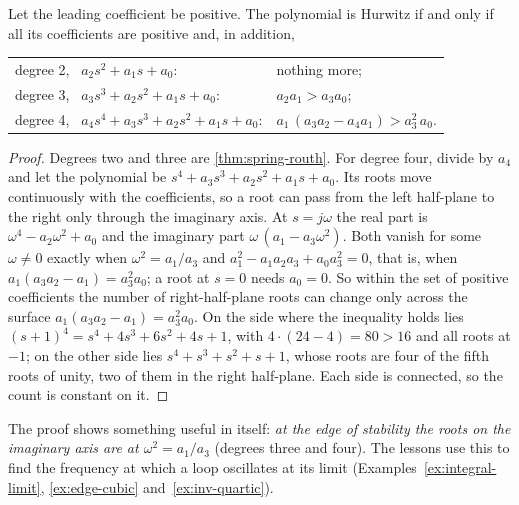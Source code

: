 \begin{theorem}
\label{thm:B-low}
Let the leading coefficient be positive. The polynomial is Hurwitz if and only if all its coefficients are positive and, in addition,
\begin{center}
\renewcommand{\arraystretch}{1.35}
\begin{tabular}{@{}ll@{}}
degree 2, \ $a_2s^2 + a_1s + a_0$: & nothing more;\\
degree 3, \ $a_3s^3 + a_2s^2 + a_1s + a_0$: & $a_2a_1 > a_3a_0$;\\
degree 4, \ $a_4s^4 + a_3s^3 + a_2s^2 + a_1s + a_0$: & $a_1\,(a_3a_2 - a_4a_1) > a_3^2\,a_0$.
\end{tabular}
\end{center}
\end{theorem}
\begin{proof}
Degrees two and three are \cref{thm:spring-routh}. For degree four, divide by $a_4$ and let the polynomial be $s^4 + a_3s^3 + a_2s^2 + a_1s + a_0$. Its roots move continuously with the coefficients, so a root can pass from the left half-plane to the right only through the imaginary axis. At $s = j\omega$ the real part is $\omega^4 - a_2\omega^2 + a_0$ and the imaginary part $\omega\,(a_1 - a_3\omega^2)$. Both vanish for some $\omega \ne 0$ exactly when $\omega^2 = a_1/a_3$ and $a_1^2 - a_1a_2a_3 + a_0a_3^2 = 0$, that is, when $a_1(a_3a_2 - a_1) = a_3^2a_0$; a root at $s = 0$ needs $a_0 = 0$. So within the set of positive coefficients the number of right-half-plane roots can change only across the surface $a_1(a_3a_2 - a_1) = a_3^2a_0$. On the side where the inequality holds lies $(s + 1)^4 = s^4 + 4s^3 + 6s^2 + 4s + 1$, with $4 \cdot (24 - 4) = 80 > 16$ and all roots at $-1$; on the other side lies $s^4 + s^3 + s^2 + s + 1$, whose roots are four of the fifth roots of unity, two of them in the right half-plane. Each side is connected, so the count is constant on it.
\end{proof}

The proof shows something useful in itself: \emph{at the edge of stability the roots on the imaginary axis are at $\omega^2 = a_1/a_3$} (degrees three and four). The lessons use this to find the frequency at which a loop oscillates at its limit (Examples~\ref{ex:integral-limit}, \ref{ex:edge-cubic} and~\ref{ex:inv-quartic}).

